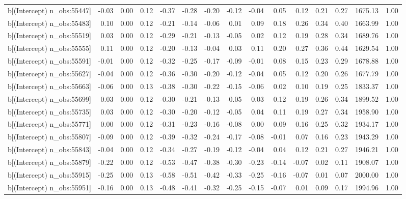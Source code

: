 \begin{table}[ht]
\begin{tabular}{rrrrrrrrrrrrrrr}
  b[(Intercept) n\_obs:55447] & -0.03 & 0.00 & 0.12 & -0.37 & -0.28 & -0.20 & -0.12 & -0.04 & 0.05 & 0.12 & 0.21 & 0.27 & 1675.13 & 1.00 \\ 
  b[(Intercept) n\_obs:55483] & 0.10 & 0.00 & 0.12 & -0.21 & -0.14 & -0.06 & 0.01 & 0.09 & 0.18 & 0.26 & 0.34 & 0.40 & 1663.99 & 1.00 \\ 
  b[(Intercept) n\_obs:55519] & 0.03 & 0.00 & 0.12 & -0.29 & -0.21 & -0.13 & -0.05 & 0.02 & 0.12 & 0.19 & 0.28 & 0.34 & 1689.76 & 1.00 \\ 
  b[(Intercept) n\_obs:55555] & 0.11 & 0.00 & 0.12 & -0.20 & -0.13 & -0.04 & 0.03 & 0.11 & 0.20 & 0.27 & 0.36 & 0.44 & 1629.54 & 1.00 \\ 
  b[(Intercept) n\_obs:55591] & -0.01 & 0.00 & 0.12 & -0.32 & -0.25 & -0.17 & -0.09 & -0.01 & 0.08 & 0.15 & 0.23 & 0.29 & 1678.88 & 1.00 \\ 
  b[(Intercept) n\_obs:55627] & -0.04 & 0.00 & 0.12 & -0.36 & -0.30 & -0.20 & -0.12 & -0.04 & 0.05 & 0.12 & 0.20 & 0.26 & 1677.79 & 1.00 \\ 
  b[(Intercept) n\_obs:55663] & -0.06 & 0.00 & 0.13 & -0.38 & -0.30 & -0.22 & -0.15 & -0.06 & 0.02 & 0.10 & 0.19 & 0.25 & 1833.37 & 1.00 \\ 
  b[(Intercept) n\_obs:55699] & 0.03 & 0.00 & 0.12 & -0.30 & -0.21 & -0.13 & -0.05 & 0.03 & 0.12 & 0.19 & 0.26 & 0.34 & 1899.52 & 1.00 \\ 
  b[(Intercept) n\_obs:55735] & 0.03 & 0.00 & 0.12 & -0.30 & -0.20 & -0.12 & -0.05 & 0.04 & 0.11 & 0.19 & 0.27 & 0.34 & 1958.90 & 1.00 \\ 
  b[(Intercept) n\_obs:55771] & 0.00 & 0.00 & 0.12 & -0.31 & -0.23 & -0.16 & -0.08 & 0.00 & 0.09 & 0.16 & 0.25 & 0.32 & 1934.17 & 1.00 \\ 
  b[(Intercept) n\_obs:55807] & -0.09 & 0.00 & 0.12 & -0.39 & -0.32 & -0.24 & -0.17 & -0.08 & -0.01 & 0.07 & 0.16 & 0.23 & 1943.29 & 1.00 \\ 
  b[(Intercept) n\_obs:55843] & -0.04 & 0.00 & 0.12 & -0.34 & -0.27 & -0.19 & -0.12 & -0.04 & 0.04 & 0.12 & 0.21 & 0.27 & 1946.21 & 1.00 \\ 
  b[(Intercept) n\_obs:55879] & -0.22 & 0.00 & 0.12 & -0.53 & -0.47 & -0.38 & -0.30 & -0.23 & -0.14 & -0.07 & 0.02 & 0.11 & 1908.07 & 1.00 \\ 
  b[(Intercept) n\_obs:55915] & -0.25 & 0.00 & 0.13 & -0.58 & -0.51 & -0.42 & -0.33 & -0.25 & -0.16 & -0.07 & 0.01 & 0.07 & 2000.00 & 1.00 \\ 
  b[(Intercept) n\_obs:55951] & -0.16 & 0.00 & 0.13 & -0.48 & -0.41 & -0.32 & -0.25 & -0.15 & -0.07 & 0.01 & 0.09 & 0.17 & 1994.96 & 1.00 \\ 

\end{tabular}
\end{table}
